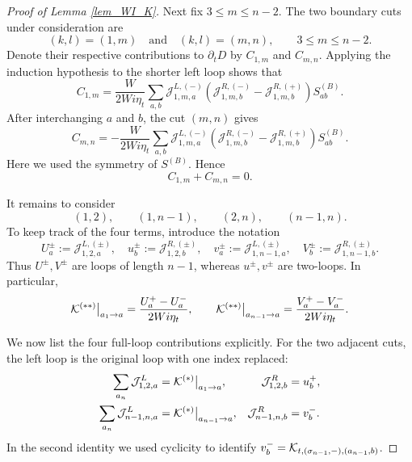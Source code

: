 \documentclass[10pt,reqno]{article}
\theoremstyle{plain} %
\theoremstyle{remark}
\numberwithin{equation}{section}
\begin{document}
\begin{proof}[Proof of Lemma \ref{lem_WI_K}]
Next fix $3\leq m\leq n-2$. The two boundary cuts under consideration are
\begin{equation}\label{consjahz}
 (k,l)=(1,m)\quad\text{and}\quad(k,l)=(m,n),
 \qquad 3\leq m\leq n-2.
\end{equation}
Denote their respective contributions to $\partial_tD$ by $C_{1,m}$ and
$C_{m,n}$. Applying the induction hypothesis to the shorter left loop shows
that
\begin{equation}\label{awslw22}
 C_{1,m}=\frac{W}{2Wi\eta_t}\sum_{a,b}
 \mathcal J^{L,(-)}_{1,m,a}
 \left(\mathcal J^{R,(-)}_{1,m,b}
 -\mathcal J^{R,(+)}_{1,m,b}\right)S^{(B)}_{ab}.
\end{equation}
After interchanging $a$ and $b$, the cut $(m,n)$ gives
\begin{equation}\label{awslw33}
 C_{m,n}=-\frac{W}{2Wi\eta_t}\sum_{a,b}
 \mathcal J^{L,(-)}_{1,m,a}
 \left(\mathcal J^{R,(-)}_{1,m,b}
 -\mathcal J^{R,(+)}_{1,m,b}\right)S^{(B)}_{ab}.
\end{equation}
Here we used the symmetry of $S^{(B)}$. Hence
\begin{equation}\label{uisiip}
 C_{1,m}+C_{m,n}=0.
\end{equation}

It remains to consider
\begin{equation}\label{keayew}
 (1,2),\qquad (1,n-1),\qquad (2,n),\qquad (n-1,n).
\end{equation}
To keep track of the four terms, introduce the notation
\begin{equation}
 U_a^\pm:=\mathcal J^{L,(\pm)}_{1,2,a},
 \quad u_b^\pm:=\mathcal J^{R,(\pm)}_{1,2,b},
 \quad v_a^\pm:=\mathcal J^{L,(\pm)}_{1,n-1,a},
 \quad V_b^\pm:=\mathcal J^{R,(\pm)}_{1,n-1,b}.
\end{equation}
Thus $U^\pm,V^\pm$ are loops of length $n-1$, whereas $u^\pm,v^\pm$
are two-loops. In particular,
\begin{equation}
 {\cal K}^{(**)}\big|_{a_1\to a}
 =\frac{U_a^+-U_a^-}{2Wi\eta_t},
 \qquad
 {\cal K}^{(**)}\big|_{a_{n-1}\to a}
 =\frac{V_a^+-V_a^-}{2Wi\eta_t}.
\end{equation}

We now list the four full-loop contributions explicitly. For the two
adjacent cuts, the left loop is the original loop with one index replaced:
\begin{align*}
 \sum_{a_n}\mathcal J^L_{1,2,a}
 &={\cal K}^{(*)}\big|_{a_1\to a},
 &\mathcal J^R_{1,2,b}&=u_b^+,\\
 \sum_{a_n}\mathcal J^L_{n-1,n,a}
 &={\cal K}^{(*)}\big|_{a_{n-1}\to a},
 &\mathcal J^R_{n-1,n,b}&=v_b^-.
\end{align*}
In the second identity we used cyclicity to identify
$v_b^-={\cal K}_{t,(\sigma_{n-1},-),(a_{n-1},b)}$.


\end{proof}
\end{document}
